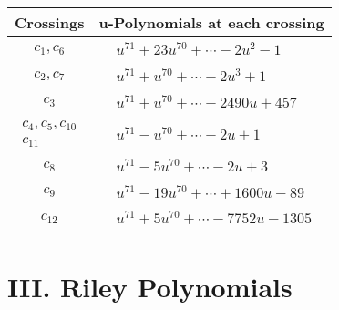 \documentclass[1p]{elsarticle_modified}
\theoremstyle{definition}
\begin{document}
\begin{tabular}{m{50pt}|m{274pt}}
Crossings & \hspace{64pt}u-Polynomials at each crossing \\
\hline $$\begin{aligned}c_{1},c_{6}\end{aligned}$$&$\begin{aligned}
&u^{71}+23 u^{70}+\cdots-2 u^2-1
\end{aligned}$\\
\hline $$\begin{aligned}c_{2},c_{7}\end{aligned}$$&$\begin{aligned}
&u^{71}+u^{70}+\cdots-2 u^3+1
\end{aligned}$\\
\hline $$\begin{aligned}c_{3}\end{aligned}$$&$\begin{aligned}
&u^{71}+u^{70}+\cdots+2490 u+457
\end{aligned}$\\
\hline $$\begin{aligned}c_{4},c_{5},c_{10}\\c_{11}\end{aligned}$$&$\begin{aligned}
&u^{71}- u^{70}+\cdots+2 u+1
\end{aligned}$\\
\hline $$\begin{aligned}c_{8}\end{aligned}$$&$\begin{aligned}
&u^{71}-5 u^{70}+\cdots-2 u+3
\end{aligned}$\\
\hline $$\begin{aligned}c_{9}\end{aligned}$$&$\begin{aligned}
&u^{71}-19 u^{70}+\cdots+1600 u-89
\end{aligned}$\\
\hline $$\begin{aligned}c_{12}\end{aligned}$$&$\begin{aligned}
&u^{71}+5 u^{70}+\cdots-7752 u-1305
\end{aligned}$\\
\hline
\end{tabular}\newpage\renewcommand{\arraystretch}{1}
\centering \section*{ III. Riley Polynomials}
\end{document}
